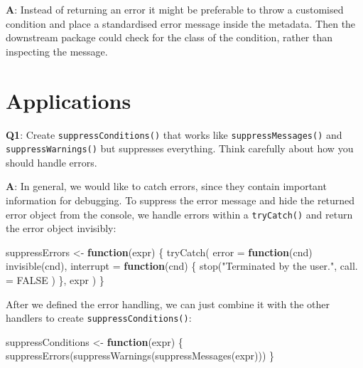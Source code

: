 \documentclass[
]{krantz}
\makeatletter
\newenvironment{Shaded}{\begin{snugshade}}{\end{snugshade}}
\newcommand{\ControlFlowTok}[1]{\textcolor[rgb]{0.13,0.29,0.53}{\textbf{#1}}}
\newcommand{\DataTypeTok}[1]{\textcolor[rgb]{0.13,0.29,0.53}{#1}}
\newcommand{\KeywordTok}[1]{\textcolor[rgb]{0.13,0.29,0.53}{\textbf{#1}}}
\newcommand{\NormalTok}[1]{#1}
\newcommand{\OtherTok}[1]{\textcolor[rgb]{0.56,0.35,0.01}{#1}}
\newcommand{\StringTok}[1]{\textcolor[rgb]{0.31,0.60,0.02}{#1}}
\newenvironment{kframe}{%
\medskip{}
\setlength{\fboxsep}{.8em}
 \def\at@end@of@kframe{}%
 \ifinner\ifhmode%
  \def\at@end@of@kframe{\end{minipage}}%
  \begin{minipage}{\columnwidth}%
 \fi\fi%
 \def\FrameCommand##1{\hskip\@totalleftmargin \hskip-\fboxsep
 \colorbox{shadecolor}{##1}\hskip-\fboxsep
     \hskip-\linewidth \hskip-\@totalleftmargin \hskip\columnwidth}%
 \MakeFramed {\advance\hsize-\width
   \@totalleftmargin\z@ \linewidth\hsize
   \@setminipage}}%
 {\par\unskip\endMakeFramed%
 \at@end@of@kframe}
\renewenvironment{Shaded}{\begin{kframe}}{\end{kframe}}
\renewcommand{\KeywordTok} [1]{\textcolor[rgb]{0.00,0.44,0.13}{{#1}}}
\renewcommand{\DataTypeTok}[1]{\textcolor[rgb]{0.56,0.13,0.00}{{#1}}}
\renewcommand{\StringTok}  [1]{\textcolor[rgb]{0.25,0.44,0.63}{{#1}}}
\renewcommand{\OtherTok}   [1]{\textcolor[rgb]{0.00,0.44,0.13}{{#1}}}
\renewcommand{\NormalTok}  [1]{{#1}}
\makeatother
\begin{document}
\textbf{{A}}: Instead of returning an error it might be preferable to throw a customised condition and place a standardised error message inside the metadata. Then the downstream package could check for the class of the condition, rather than inspecting the message.

\hypertarget{applications-1}{%
\section{Applications}\label{applications-1}}

\textbf{{Q1}}: Create \texttt{suppressConditions()} that works like \texttt{suppressMessages()} and \texttt{suppressWarnings()} but suppresses everything. Think carefully about how you should handle errors.

\textbf{{A}}: In general, we would like to catch errors, since they contain important information for debugging. To suppress the error message and hide the returned error object from the console, we handle errors within a \texttt{tryCatch()} and return the error object invisibly:

\begin{Shaded}
\begin{Highlighting}[]
\NormalTok{suppressErrors <-}\StringTok{ }\ControlFlowTok{function}\NormalTok{(expr) \{}
  \KeywordTok{tryCatch}\NormalTok{(}
    \DataTypeTok{error =} \ControlFlowTok{function}\NormalTok{(cnd) }\KeywordTok{invisible}\NormalTok{(cnd),}
    \DataTypeTok{interrupt =} \ControlFlowTok{function}\NormalTok{(cnd) \{}
      \KeywordTok{stop}\NormalTok{(}\StringTok{"Terminated by the user."}\NormalTok{,}
        \DataTypeTok{call. =} \OtherTok{FALSE}
\NormalTok{      )}
\NormalTok{    \},}
\NormalTok{    expr}
\NormalTok{  )}
\NormalTok{\}}
\end{Highlighting}
\end{Shaded}

After we defined the error handling, we can just combine it with the other handlers to create \texttt{suppressConditions()}:

\begin{Shaded}
\begin{Highlighting}[]
\NormalTok{suppressConditions <-}\StringTok{ }\ControlFlowTok{function}\NormalTok{(expr) \{}
  \KeywordTok{suppressErrors}\NormalTok{(}\KeywordTok{suppressWarnings}\NormalTok{(}\KeywordTok{suppressMessages}\NormalTok{(expr)))}
\NormalTok{\}}
\end{Highlighting}
\end{Shaded}
\end{document}
